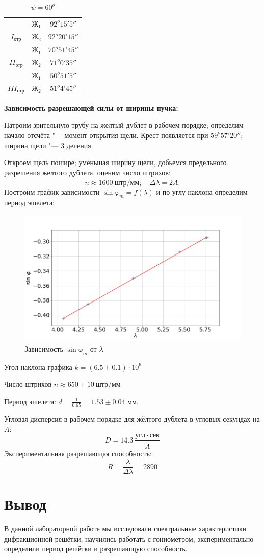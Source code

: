 \documentclass[a4paper,12pt]{article}
\begin{document}
\begin{table}[h]	
\begin{center}
\begin{tabular}{|c|c|c|} \hline
& $Ж_1$ & $92^o15'5''$\\
\cline{2-3}
$I_{отр}$
& $Ж_2$ & $92^o20'15''$ \\\hline
& $Ж_1$ & $70^o51'45''$ \\
\cline{2-3}
$II_{отр}$
& $Ж_2$ & $71^o0'35''$ \\\hline
& $Ж_1$ & $50^o51'5''$\\
\cline{2-3}
$III_{отр}$
& $Ж_2$ & $51^o4'45''$ \\\hline
\end{tabular}
\caption{$\psi = 60^o$}
\end{center}
\end{table}
\textbf{Зависимость разрешающей силы от ширины пучка:}

Натроим зрительную трубу на желтый дублет в рабочем порядке; определим начало отсчёта "--- момент открытия щели. Крест появляется при $59^o57'20''$; ширина щели "--- 3 деления.

Откроем щель пошире; уменьшая ширину щели, добьемся предельного разрешения желтого дублета, оценим число штрихов:
\[
	 n \approx 1600\ штр/мм; \quad \Delta \lambda = 2 \dot A.
\]
Построим график зависимости $\sin \varphi_m = f(\lambda)$ и по углу наклона определим период эшелета:
\begin{figure}[h]
	\includegraphics[width = 1.0\linewidth]{g1.png}
	\caption*{Зависимость $\sin \varphi_m$ от $\lambda$}
\end{figure}
Угол наклона графика $k = (6.5 \pm 0.1)\cdot 10^6$

Число штрихов $n \approx 650 \pm 10\ штр/мм$

Период эшелета: $d = \frac{1}{0.65} = 1.53 \pm 0.04$ мм.

Угловая дисперсия в рабочем порядке для жёлтого дублета в угловых секундах на $\dot A$:
\[
D = 14.3\ \frac{угл \cdot сек}{\dot A}
\]
Экспериментальная разрешающая способность:
\[
R = \frac{\lambda}{\Delta \lambda} = 2890
\]
\newpage
\section*{Вывод}
В данной лабораторной работе мы исследовали спектральные характеристики дифракционной решётки, научились работать с гониометром, экспериментально определили период решётки и  разрешающую способность.
\end{document}
